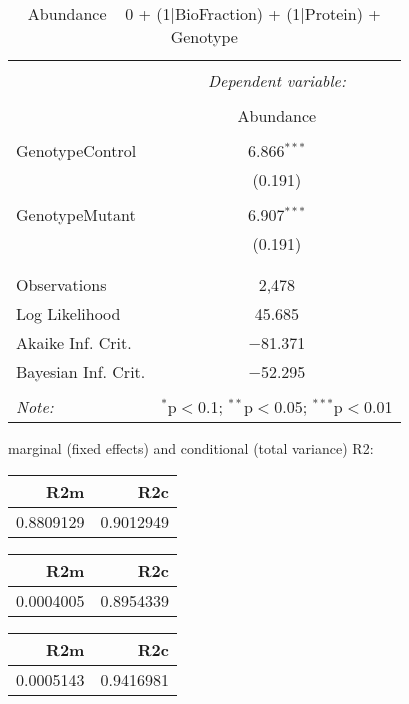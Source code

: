 \documentclass[11pt]{report}
\begin{document}
\begin{table}[!htbp] \centering 
  \caption{Abundance ~ 0 + (1|BioFraction) + (1|Protein) + Genotype} 
  \label{} 
\begin{tabular}{@{\extracolsep{5pt}}lc} 
\\[-1.8ex]\hline 
\hline \\[-1.8ex] 
 & \multicolumn{1}{c}{\textit{Dependent variable:}} \\ 
\cline{2-2} 
\\[-1.8ex] & Abundance \\ 
\hline \\[-1.8ex] 
 GenotypeControl & 6.866$^{***}$ \\ 
  & (0.191) \\ 
  & \\ 
 GenotypeMutant & 6.907$^{***}$ \\ 
  & (0.191) \\ 
  & \\ 
\hline \\[-1.8ex] 
Observations & 2,478 \\ 
Log Likelihood & 45.685 \\ 
Akaike Inf. Crit. & $-$81.371 \\ 
Bayesian Inf. Crit. & $-$52.295 \\ 
\hline 
\hline \\[-1.8ex] 
\textit{Note:}  & \multicolumn{1}{r}{$^{*}$p$<$0.1; $^{**}$p$<$0.05; $^{***}$p$<$0.01} \\ 
\end{tabular} 
\end{table} 
marginal (fixed effects) and conditional (total variance) R2:

\begin{tabular}{r|r}
\hline
R2m & R2c\\
\hline
0.8809129 & 0.9012949\\
\hline
\end{tabular}

\begin{tabular}{r|r}
\hline
R2m & R2c\\
\hline
0.0004005 & 0.8954339\\
\hline
\end{tabular}

\begin{tabular}{r|r}
\hline
R2m & R2c\\
\hline
0.0005143 & 0.9416981\\
\hline
\end{tabular}
\end{document}
